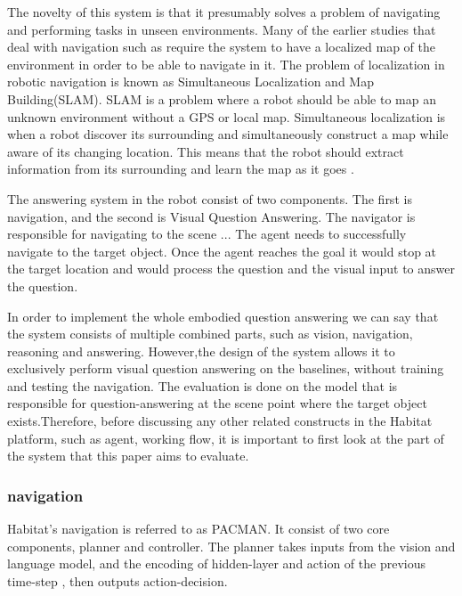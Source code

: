 The novelty of this system is that it presumably solves a problem of navigating and performing tasks in unseen environments. Many of the earlier studies that deal with navigation such as \cite{kruijff2007situated}\cite{lauria2001training} require the system to have a localized map of the environment in order to be able to navigate in it. The problem of localization in robotic navigation is known as Simultaneous Localization and Map Building(SLAM). SLAM is a problem where a robot should be able to  map an unknown environment without a GPS or local map. Simultaneous localization is when a robot discover its surrounding and simultaneously construct a map while aware of its changing location. This means that the robot should extract information from its surrounding and learn the map as it goes \cite{grisetti2010tutorial} \cite{938381} \cite{8482266}. 



The answering system in the robot consist of two components. The first is navigation, and the second is Visual Question Answering. The navigator is responsible for navigating to the scene ... The agent needs to successfully navigate to the target object. Once the agent reaches the goal it would stop at the target location and would process the question and the visual input to answer the question.




In order to implement the whole embodied question answering we can say that the system consists of multiple combined parts, such as vision, navigation, reasoning and answering. However,the design of the system allows it to exclusively perform visual question answering on the baselines, without training and testing the navigation. The evaluation is done on the model that is responsible for question-answering at the scene point where the target object exists.Therefore, before discussing any other related constructs in the Habitat platform, such as agent, working flow, it is important to first look at the part of the system that this paper aims to evaluate. 









\subsubsection{navigation}



Habitat's navigation is referred to as PACMAN. It consist of two core components, planner and controller. The planner takes inputs from the vision and language model, and the encoding of hidden-layer and action of the previous time-step , then outputs action-decision. 

